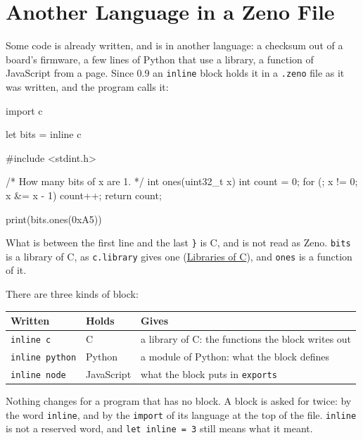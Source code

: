 \chapter{Another Language in a Zeno File}\label{ch-inline}

Some code is already written, and is in another language: a checksum
out of a board's firmware, a few lines of Python that use a library, a
function of JavaScript from a page. Since 0.9 an \verb|inline| block
holds it in a \verb|.zeno| file as it was written, and the program
calls it:

\begin{zeno}[file=ones.zeno, dir=blocks]
import c

let bits = inline c {
    #include <stdint.h>

    /* How many bits of x are 1. */
    int ones(uint32_t x) {
        int count = 0;
        for (; x != 0; x &= x - 1) {
            count++;
        }
        return count;
    }
}

print(bits.ones(0xA5))
\end{zeno}

What is between the first line and the last \verb|}| is C, and is not
read as Zeno. \verb|bits| is a library of C, as \verb|c.library| gives
one (\hyperref[ch-c-libraries]{Libraries of C}), and \verb|ones| is a
function of it.

There are three kinds of block:

\begin{center}
\begin{tabular}{llP{6.4cm}}
\toprule
Written & Holds & Gives \\
\midrule
\verb|inline c| & C & a library of C: the functions the block writes
  out \\
\verb|inline python| & Python & a module of Python: what the block
  defines \\
\verb|inline node| & JavaScript & what the block puts in
  \verb|exports| \\
\bottomrule
\end{tabular}
\end{center}

\begin{note}
Nothing changes for a program that has no block. A block is asked for
twice: by the word \verb|inline|, and by the \verb|import| of its
language at the top of the file. \verb|inline| is not a reserved
word, and \verb|let inline = 3| still means what it meant.
\end{note}

